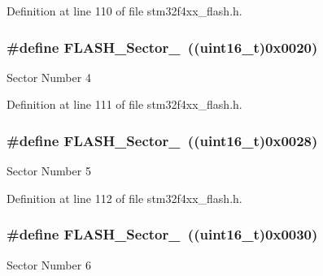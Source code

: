 Definition at line 110 of file stm32f4xx\-\_\-flash.\-h.

\hypertarget{group___f_l_a_s_h___sectors_ga389be89b2f79824cc2682a25297adf4a}{
\subsubsection[{F\-L\-A\-S\-H\-\_\-\-Sector\-\_\-4}]{\setlength{\rightskip}{0pt plus 5cm}\#define F\-L\-A\-S\-H\-\_\-\-Sector\-\_~((uint16\-\_\-t)0x0020)}}\label{group___f_l_a_s_h___sectors_ga389be89b2f79824cc2682a25297adf4a}
Sector Number 4 

Definition at line 111 of file stm32f4xx\-\_\-flash.\-h.

\hypertarget{group___f_l_a_s_h___sectors_ga79028613994f20106c3fc2dfd56d8085}{
\subsubsection[{F\-L\-A\-S\-H\-\_\-\-Sector\-\_\-5}]{\setlength{\rightskip}{0pt plus 5cm}\#define F\-L\-A\-S\-H\-\_\-\-Sector\-\_~((uint16\-\_\-t)0x0028)}}\label{group___f_l_a_s_h___sectors_ga79028613994f20106c3fc2dfd56d8085}
Sector Number 5 

Definition at line 112 of file stm32f4xx\-\_\-flash.\-h.

\hypertarget{group___f_l_a_s_h___sectors_gadeda2fce59d9ee17d7cc1025d1b6352d}{
\subsubsection[{F\-L\-A\-S\-H\-\_\-\-Sector\-\_\-6}]{\setlength{\rightskip}{0pt plus 5cm}\#define F\-L\-A\-S\-H\-\_\-\-Sector\-\_~((uint16\-\_\-t)0x0030)}}\label{group___f_l_a_s_h___sectors_gadeda2fce59d9ee17d7cc1025d1b6352d}
Sector Number 6 

